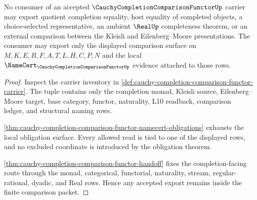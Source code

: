 \begin{theorem}
\label{thm:cauchy-completion-comparison-functor-nonescape}
No consumer of an accepted $\CauchyCompletionComparisonFunctorUp$ carrier may export quotient completion equality, host equality of completed objects, a choice-selected representative, an ambient $\RealUp$ completeness theorem, or an external comparison between the Kleisli and Eilenberg--Moore presentations. The consumer may export only the displayed comparison surface on $M,K,E,B,F,A,T,L,H,C,P,N$ and the local $\NameCert_{\CauchyCompletionComparisonFunctorUp}$ evidence attached to those rows.
\end{theorem}
\begin{proof}
Inspect the carrier inventory in \autoref{def:cauchy-completion-comparison-functor-carrier}. The tuple contains only the completion monad, Kleisli source, Eilenberg--Moore target, base category, functor, naturality, L10 readback, comparison ledger, and structural naming rows.

\autoref{thm:cauchy-completion-comparison-functor-namecert-obligations} exhausts the local obligation surface. Every allowed read is tied to one of the displayed rows, and no excluded coordinate is introduced by the obligation theorem.

\autoref{thm:cauchy-completion-comparison-functor-handoff} fixes the completion-facing route through the monad, categorical, functorial, naturality, stream, regular-rational, dyadic, and Real rows. Hence any accepted export remains inside the finite comparison packet.
\end{proof}



